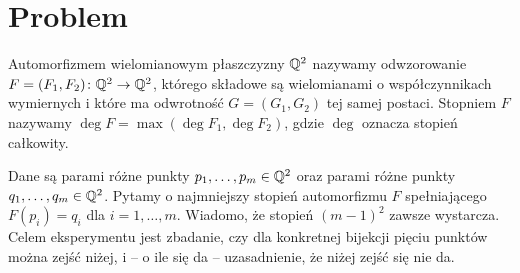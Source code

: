 \section{Problem}

\begin{definicja}
Automorfizmem wielomianowym płaszczyzny $\mathbb{Q}^2$ nazywamy odwzorowanie
$F=(F_1,F_2)\colon\mathbb{Q}^2\to\mathbb{Q}^2$, którego składowe są wielomianami o współczynnikach
wymiernych i które ma odwrotność $G=(G_1,G_2)$ tej samej postaci. Stopniem $F$ nazywamy
$\deg F=\max(\deg F_1,\deg F_2)$, gdzie $\deg$ oznacza stopień całkowity.
\end{definicja}

Dane są parami różne punkty $p_1,\dots,p_m\in\mathbb{Q}^2$ oraz parami różne punkty
$q_1,\dots,q_m\in\mathbb{Q}^2$. Pytamy o najmniejszy stopień automorfizmu $F$ spełniającego
$F(p_i)=q_i$ dla $i=1,\dots,m$. Wiadomo, że stopień $(m-1)^2$ zawsze wystarcza.
Celem eksperymentu jest zbadanie, czy dla konkretnej bijekcji pięciu punktów można
zejść niżej, i -- o ile się da -- uzasadnienie, że niżej zejść się nie da.
